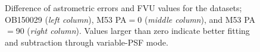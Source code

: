 \documentclass[]{spie}  %
\begin{document}
\begin{figure}[!h]
  \hspace{-1.5cm}
  \caption{\footnotesize Difference of astrometric errors and FVU values for the datasets; OB150029 (\textit{left column}), M53 PA$=$0 (\textit{middle column}), and M53 PA$=$90 (\textit{right column}). Values larger than zero indicate better fitting and subtraction through variable-PSF mode.} \label{fig:ob-m53-astrom}
\end{figure}
\end{document}
